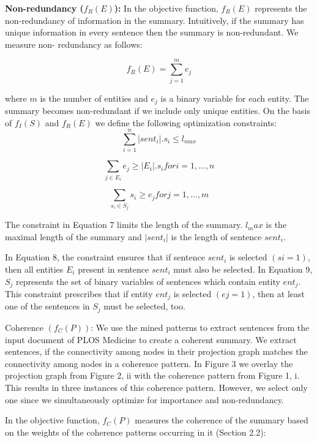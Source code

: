 \textbf{Non-redundancy ($f_R(E)$):} In the objective function, $f_R(E)$ represents the non-redundancy of information in the summary. Intuitively, if the summary has unique information in every sentence then the summary is non-redundant. 
We measure non- redundancy as follows:

\begin{equation}
f_R(E) = \sum_{j=1}^{m}{e_j}
\end{equation}

where $m$ is the number of entities and $e_j$ is a binary variable for each entity. 
The summary becomes non-redundant if we include only unique entities. 
On the basis of $f_I(S)$ and $f_R(E)$ we define the following optimization constraints:
\begin{equation}
\sum_{i=1}^{n} |sent_i|.s_i \le l_{max}
\end{equation}

\begin{equation}
\sum_{j\in E_i} {e_j  \ge |E_i|.s_i} for i = 1,...,n
\end{equation}

\begin{equation}
\sum_{s_i \in S_j}{s_i \ge e_j} for j = 1,...,m
\end{equation}

The constraint in Equation 7 limits the length of the summary. 
$l_max$ is the maximal length of the summary and $|sent_i|$ is the length of sentence $sent_i$.

In Equation 8, the constraint ensures that if sentence $sent_i$ is selected $(si = 1)$, then all entities $E_i$ present in sentence $sent_i$ must also be selected. 
In Equation 9, $S_j$ represents the set of binary variables of sentences which contain entity $ent_j$. 
This constraint prescribes that if entity $ent_j$ is selected $(ej = 1)$, then at least one of the sentences in $S_j$ must be selected, too.

Coherence $(f_C(P))$: We use the mined patterns to extract sentences from the input document of PLOS Medicine to create a coherent summary. 
We extract sentences, if the connectivity among nodes in their projection graph matches the connectivity among nodes in a coherence pattern. 
In Figure 3 we overlay the projection graph from Figure 2, ii with the coherence pattern from Figure 1, i. 
This results in three instances of this coherence pattern. 
However, we select only one since we simultaneously optimize for importance and non-redundancy. 

In the objective function, $f_C(P )$ measures the coherence of the summary based on the weights of the coherence patterns occurring in it (Section 2.2):

